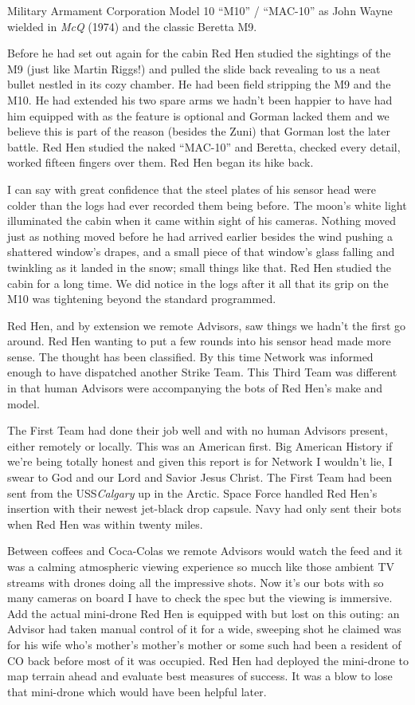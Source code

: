 \documentclass[13pt|draft]{report}
\begin{document}
Military Armament Corporation Model 10 ``M10'' / ``MAC-10'' as John Wayne wielded in \textit{McQ} (1974) and the classic Beretta M9.

Before he had set out again for the cabin Red Hen studied the sightings of the M9 (just like Martin Riggs!) and pulled the slide back revealing to us a neat bullet nestled in its cozy chamber. He had been field stripping the M9 and the M10. He had extended his two spare arms we hadn't been happier to have had him equipped with as the feature is optional and Gorman lacked them and we believe this is part of the reason (besides the Zuni) that Gorman lost the later battle. Red Hen studied the naked ``MAC-10'' and Beretta, checked every detail, worked fifteen fingers over them. Red Hen began its hike back.

I can say with great confidence that the steel plates of his sensor head were colder than the logs had ever recorded them being before. The moon's white light illuminated the cabin when it came within sight of his cameras. Nothing moved just as nothing moved before he had arrived earlier besides the wind pushing a shattered window's drapes, and a small piece of that window's glass falling and twinkling as it landed in the snow; small things like that. Red Hen studied the cabin for a long time. We did notice in the logs after it all that its grip on the M10 was tightening beyond the standard programmed.

Red Hen, and by extension we remote Advisors, saw things we hadn't the first go around. Red Hen wanting to put a few rounds into his sensor head made more sense. The thought has been classified. By this time Network was informed enough to have dispatched another Strike Team. This Third Team was different in that human Advisors were accompanying the bots of Red Hen's make and model.

The First Team had done their job well and with no human Advisors present, either remotely or locally. This was an American first. Big American History if we're being totally honest and given this report is for Network I wouldn't lie, I swear to God and our Lord and Savior Jesus Christ. The First Team had been sent from the USS\textit{Calgary} up in the Arctic. Space Force handled Red Hen's insertion with their newest jet-black drop capsule. Navy had only sent their bots when Red Hen was within twenty miles.

Between coffees and Coca-Colas we remote Advisors would watch the feed and it was a calming atmospheric viewing experience so mucch like those ambient TV streams with drones doing all the impressive shots. Now it's our bots with so many cameras on board I have to check the spec but the viewing is immersive. Add the actual mini-drone Red Hen is equipped with but lost on this outing: an Advisor had taken manual control of it for a wide, sweeping shot he claimed was for his wife who's mother's mother's mother or some such had been a resident of CO back before most of it was occupied. Red Hen had deployed the mini-drone to map terrain ahead and evaluate best measures of success. It was a blow to lose that mini-drone which would have been helpful later.
\end{document}
